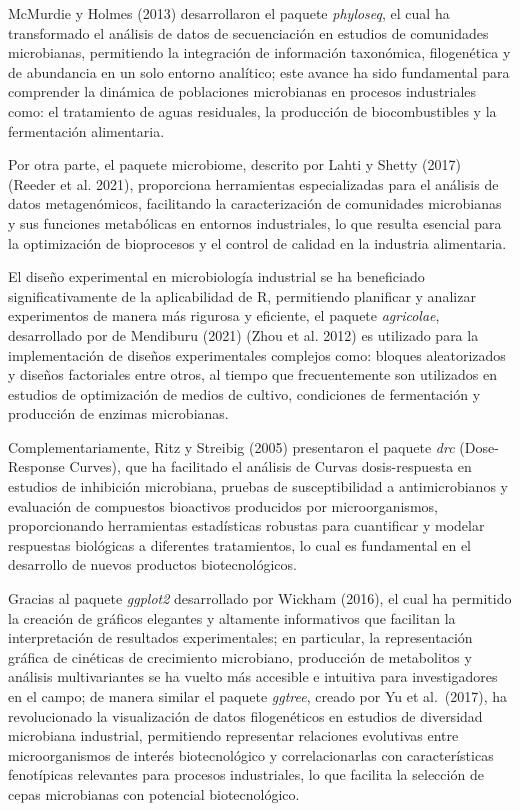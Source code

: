 \documentclass[
  letterpaper,
  DIV=11,
  numbers=noendperiod]{scrreprt}
\begin{document}
McMurdie y Holmes (2013) desarrollaron el paquete \emph{phyloseq}, el
cual ha transformado el análisis de datos de secuenciación en estudios
de comunidades microbianas, permitiendo la integración de información
taxonómica, filogenética y de abundancia en un solo entorno analítico;
este avance ha sido fundamental para comprender la dinámica de
poblaciones microbianas en procesos industriales como: el tratamiento de
aguas residuales, la producción de biocombustibles y la fermentación
alimentaria.

Por otra parte, el paquete microbiome, descrito por Lahti y Shetty
(2017) (Reeder et al. 2021), proporciona herramientas especializadas
para el análisis de datos metagenómicos, facilitando la caracterización
de comunidades microbianas y sus funciones metabólicas en entornos
industriales, lo que resulta esencial para la optimización de
bioprocesos y el control de calidad en la industria alimentaria.

El diseño experimental en microbiología industrial se ha beneficiado
significativamente de la aplicabilidad de R, permitiendo planificar y
analizar experimentos de manera más rigurosa y eficiente, el paquete
\emph{agricolae}, desarrollado por de Mendiburu (2021) (Zhou et al.
2012) es utilizado para la implementación de diseños experimentales
complejos como: bloques aleatorizados y diseños factoriales entre otros,
al tiempo que frecuentemente son utilizados en estudios de optimización
de medios de cultivo, condiciones de fermentación y producción de
enzimas microbianas.

Complementariamente, Ritz y Streibig (2005) presentaron el paquete
\emph{drc} (Dose-Response Curves), que ha facilitado el análisis de
Curvas dosis-respuesta en estudios de inhibición microbiana, pruebas de
susceptibilidad a antimicrobianos y evaluación de compuestos bioactivos
producidos por microorganismos, proporcionando herramientas estadísticas
robustas para cuantificar y modelar respuestas biológicas a diferentes
tratamientos, lo cual es fundamental en el desarrollo de nuevos
productos biotecnológicos.

Gracias al paquete \emph{ggplot2} desarrollado por Wickham (2016), el
cual ha permitido la creación de gráficos elegantes y altamente
informativos que facilitan la interpretación de resultados
experimentales; en particular, la representación gráfica de cinéticas de
crecimiento microbiano, producción de metabolitos y análisis
multivariantes se ha vuelto más accesible e intuitiva para
investigadores en el campo; de manera similar el paquete \emph{ggtree},
creado por Yu et al.~(2017), ha revolucionado la visualización de datos
filogenéticos en estudios de diversidad microbiana industrial,
permitiendo representar relaciones evolutivas entre microorganismos de
interés biotecnológico y correlacionarlas con características
fenotípicas relevantes para procesos industriales, lo que facilita la
selección de cepas microbianas con potencial biotecnológico.
\end{document}
